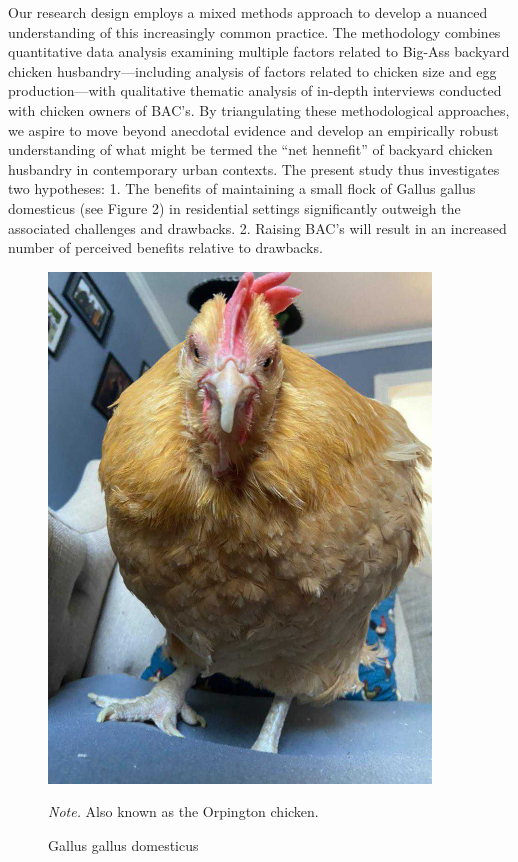 \documentclass[
  man,
  floatsintext,
  longtable,
  nolmodern,
  notxfonts,
  notimes,
  colorlinks=true,linkcolor=blue,citecolor=blue,urlcolor=blue]{apa7}
\begin{document}
Our research design employs a mixed methods approach to develop a
nuanced understanding of this increasingly common practice. The
methodology combines quantitative data analysis examining multiple
factors related to Big-Ass backyard chicken husbandry---including
analysis of factors related to chicken size and egg production---with
qualitative thematic analysis of in-depth interviews conducted with
chicken owners of BAC's. By triangulating these methodological
approaches, we aspire to move beyond anecdotal evidence and develop an
empirically robust understanding of what might be termed the ``net
hennefit'' of backyard chicken husbandry in contemporary urban contexts.
The present study thus investigates two hypotheses: 1. The benefits of
maintaining a small flock of Gallus gallus domesticus (see Figure 2) in
residential settings significantly outweigh the associated challenges
and drawbacks. 2. Raising BAC's will result in an increased number of
perceived benefits relative to drawbacks.

\begin{figure}[!htbp]

{\caption{{Gallus gallus domesticus}{\label{fig-orpington-chicken}}}}

\includegraphics[width=4in,height=\textheight,keepaspectratio]{Images_BigAssChicken/Orpignton hen(edgar).jpg}

{\noindent \emph{Note.} Also known as the Orpington chicken.}

\end{figure}
\end{document}
